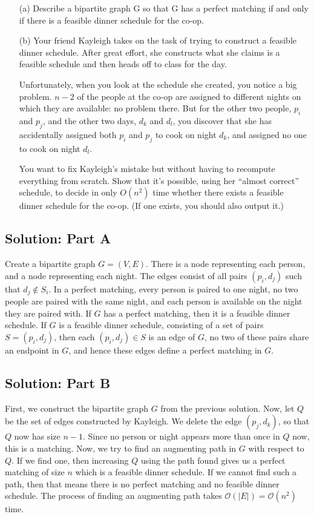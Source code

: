\documentclass[letter,11pt]{article}
\begin{document}
\begin{enumerate}

\item [(a)] Describe a bipartite graph G so that G has a perfect matching if and only if there is a feasible dinner schedule for the co-op.


\item[(b)] Your friend Kayleigh takes on the task of trying to construct a feasible dinner schedule. After great effort, she constructs what she claims is a feasible schedule and then heads off to class for the day.


Unfortunately, when you look at the schedule she created, you notice a big problem. $n - 2$ of the people at the co-op are assigned to different nights on which they are available: no problem there. But for the other two people, $p_i$ and $p_j$, and the other two days, $d_k$ and $d_l$, you discover that she has accidentally assigned both $p_i$ and $p_j$ to cook on night $d_k$, and assigned no one to cook on night $d_l$.


You want to fix Kayleigh’s mistake but without having to recompute everything from scratch. Show that it’s possible, using her “almost correct” schedule, to decide in only $O(n^2)$ time whether there exists a feasible dinner schedule for the co-op. (If one exists, you should also output it.)
\end{enumerate}

\subsection{Solution: Part A}

Create a bipartite graph $G=(V,E)$. There is a node representing each person, and a node representing each night. The edges consist of all pairs $(p_i, d_j)$ such that $d_j \notin S_i$. In a perfect matching, every person is paired to one night, no two people are paired with the same night, and each person is available on the night they are paired with. If $G$ has a perfect matching, then it is a feasible dinner schedule. If $G$ is a feasible dinner schedule, consisting of a set of pairs $S = {(p_i, d_j)}$, then each $(p_i, d_j ) \in S$ is an edge of $G$, no two of these pairs share an endpoint in $G$, and hence these edges define a perfect matching in $G$.

\subsection{Solution: Part B}

First, we construct the bipartite graph $G$ from the previous solution. Now, let $Q$ be the set of edges constructed by Kayleigh. We delete the edge $(p_j, d_k)$, so that $Q$ now has size $n - 1$. Since no person or night appears more than once in $Q$ now, this is a matching. Now, we try to find an augmenting path in $G$ with respect to $Q$. If we find one, then increasing $Q$ using the path found gives us a perfect matching of size $n$ which is a feasible dinner schedule. If we cannot find such a path, then that means there is no perfect matching and no feasible dinner schedule. The process of finding an augmenting path takes $\mathcal{O}(|E|) = \mathcal{O}(n^2)$ time.
\end{document}
